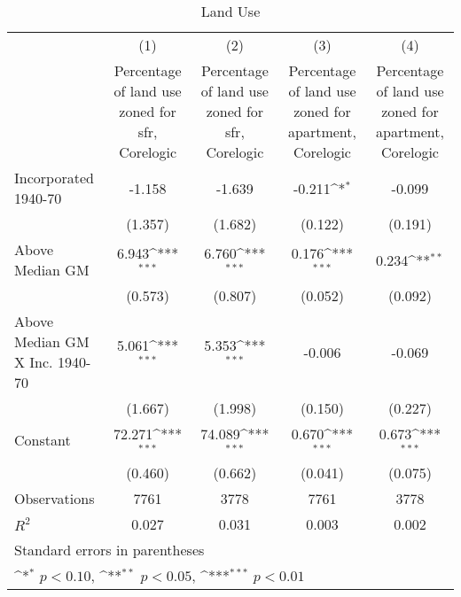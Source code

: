\begin{table}[htbp]\centering
\def\sym#1{\ifmmode^{#1}\else\(^{#1}\)\fi}
\caption{Land Use}
\begin{tabular}{l*{4}{c}}
\hline\hline
                    &\multicolumn{1}{c}{(1)}&\multicolumn{1}{c}{(2)}&\multicolumn{1}{c}{(3)}&\multicolumn{1}{c}{(4)}\\
                    &\multicolumn{1}{c}{Percentage of land use zoned for sfr, Corelogic}&\multicolumn{1}{c}{Percentage of land use zoned for sfr, Corelogic}&\multicolumn{1}{c}{Percentage of land use zoned for apartment, Corelogic}&\multicolumn{1}{c}{Percentage of land use zoned for apartment, Corelogic}\\
\hline
Incorporated 1940-70&      -1.158         &      -1.639         &      -0.211\sym{*}  &      -0.099         \\
                    &     (1.357)         &     (1.682)         &     (0.122)         &     (0.191)         \\
[1em]
Above Median GM     &       6.943\sym{***}&       6.760\sym{***}&       0.176\sym{***}&       0.234\sym{**} \\
                    &     (0.573)         &     (0.807)         &     (0.052)         &     (0.092)         \\
[1em]
Above Median GM X Inc. 1940-70&       5.061\sym{***}&       5.353\sym{***}&      -0.006         &      -0.069         \\
                    &     (1.667)         &     (1.998)         &     (0.150)         &     (0.227)         \\
[1em]
Constant            &      72.271\sym{***}&      74.089\sym{***}&       0.670\sym{***}&       0.673\sym{***}\\
                    &     (0.460)         &     (0.662)         &     (0.041)         &     (0.075)         \\
\hline
Observations        &        7761         &        3778         &        7761         &        3778         \\
\(R^{2}\)           &       0.027         &       0.031         &       0.003         &       0.002         \\
\hline\hline
\multicolumn{5}{l}{\footnotesize Standard errors in parentheses}\\
\multicolumn{5}{l}{\footnotesize \sym{*} \(p<0.10\), \sym{**} \(p<0.05\), \sym{***} \(p<0.01\)}\\
\end{tabular}
\end{table}
